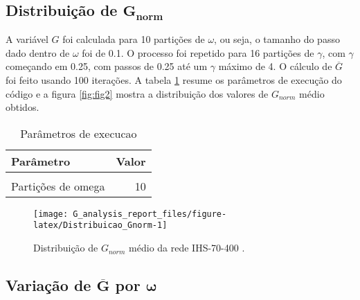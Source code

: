 \documentclass[
  12pt,
]{article}
\begin{document}
\hypertarget{distribuiuxe7uxe3o-de-mathbfg_norm}{%
\subsection{\texorpdfstring{Distribuição de
\(\mathbf{G_{norm}}\)}{Distribuição de \textbackslash mathbf\{G\_\{norm\}\}}}\label{distribuiuxe7uxe3o-de-mathbfg_norm}}

A variável \(G\) foi calculada para 10 partições de \(\omega\), ou seja,
o tamanho do passo dado dentro de \(\omega\) foi de 0.1. O processo foi
repetido para 16 partições de \(\gamma\), com \(\gamma\) começando em
0.25, com passos de 0.25 até um \(\gamma\) máximo de 4. O cálculo de
\(\overline{G}\) foi feito usando 100 iterações. A tabela \ref{tab:2}
resume os parâmetros de execução do código e a figura \ref{fig:fig2}
mostra a distribuição dos valores de \(G_{norm}\) médio obtidos.

\begin{table}[!h]

\caption{\label{tab:Parametros_Execucao}\label{tab:2}Parâmetros de execucao}
\centering
\begin{tabular}[t]{lr}
\toprule
Parâmetro & Valor\\
\midrule
\cellcolor{gray!6}{Iterações} & \cellcolor{gray!6}{100}\\
Partições de omega & 10\\
\bottomrule
\end{tabular}
\end{table}

\begin{figure}[H]

{\centering \texttt{[image: G\_analysis\_report\_files/figure-latex/Distribuicao\_Gnorm-1]} 

}

\caption{\label{fig:fig2}Distribuição de $G_{norm}$ médio da rede  IHS-70-400 .}\label{fig:Distribuicao_Gnorm}
\end{figure}

\hypertarget{variauxe7uxe3o-de-mathbfoverlineg-por-boldsymbolomega}{%
\subsection{\texorpdfstring{Variação de \(\mathbf{\overline{G}}\) por
\(\boldsymbol{\omega}\)}{Variação de \textbackslash mathbf\{\textbackslash overline\{G\}\} por \textbackslash boldsymbol\{\textbackslash omega\}}}\label{variauxe7uxe3o-de-mathbfoverlineg-por-boldsymbolomega}}
\end{document}
